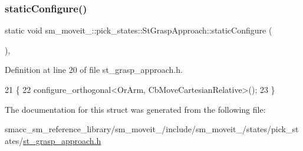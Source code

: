 \subsubsection{\texorpdfstring{static\+Configure()}{staticConfigure()}}
{\footnotesize\ttfamily static void sm\+\_\+moveit\+\_\+::pick\+\_\+states\+::\+St\+Grasp\+Approach\+::static\+Configure (\begin{DoxyParamCaption}{ }\end{DoxyParamCaption})\hspace{0.3cm}{\ttfamily [inline]}, {\ttfamily [static]}}



Definition at line 20 of file st\+\_\+grasp\+\_\+approach.\+h.


\begin{DoxyCode}
21     \{ 
22         configure\_orthogonal<OrArm, CbMoveCartesianRelative>();
23     \}
\end{DoxyCode}


The documentation for this struct was generated from the following file\+:\begin{DoxyCompactItemize}
\item 
smacc\+\_\+sm\+\_\+reference\+\_\+library/sm\+\_\+moveit\+\_/include/sm\+\_\+moveit\+\_/states/pick\+\_\+states/\hyperlink{3_2include_2sm__moveit__3_2states_2pick__states_2st__grasp__approach_8h}{st\+\_\+grasp\+\_\+approach.\+h}\end{DoxyCompactItemize}
